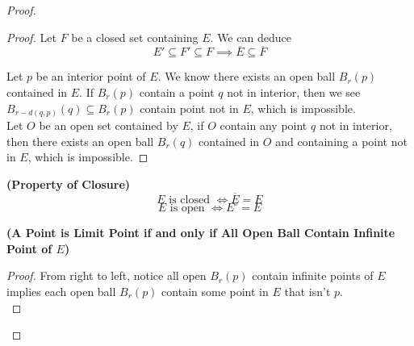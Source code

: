 \documentclass{report}
\begin{document}
\begin{proof}
\begin{proof}
Let $F$ be a closed set containing  $E$. We can deduce 
 \begin{equation}
E'\subseteq F'\subseteq F\implies \overline{E}\subseteq \overline{F}
\end{equation}

Let $p$ be an interior point of $E$. We know there exists an open ball  $B_r(p)$ contained in $E$. If $B_r(p)$ contain a point $q$ not in interior, then we see $B_{r-d(q,p)}(q)\subseteq B_r(p)$ contain point not in $E$, which is impossible.\\

Let $O$ be an open set contained by $E$, if  $O$ contain any point $q$ not in interior, then there exists an open ball $B_r(q)$ contained in $O$ and containing a point not in $E$, which is impossible.  
\end{proof}
\begin{corollary}
\label{1.9.5}
\textbf{(Property of Closure)}
\begin{equation}
\text{ $E$ is closed $\iff \overline{E}=E$ }
\end{equation}
\begin{equation}
\text{ $E$ is open $\iff E^\circ =E$ }
\end{equation}
\end{corollary}
\begin{theorem}
\label{1.9.6}
\textbf{(A Point is Limit Point if and only if All Open Ball Contain Infinite Point of $E$)} 
\end{theorem}
\begin{proof}
  From right to left, notice all open $B_r(p)$ contain infinite points of $E$ implies each open ball $B_r(p)$ contain some point in $E$ that isn't  $p$.\\


\end{proof}
\end{proof}
\end{document}
